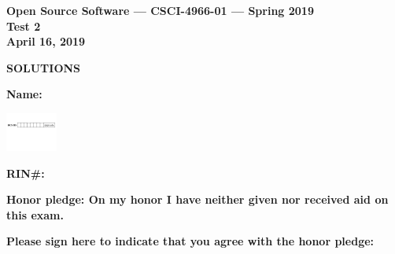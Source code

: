 \documentclass[10pt]{article}
\begin{document}
\thispagestyle{empty}

\vspace*{0.5in}

\begin{center}
\Large
\textbf{Open Source Software --- CSCI-4966-01 --- Spring 2019} \\
\textbf{Test 2} \\
\textbf{April 16, 2019}
\end{center}


\beginanswers
\begin{center}
\Large
\textbf{SOLUTIONS}
\end{center}

\else


\begin{center}

\textbf{\Large Name:} \underline {\hspace{2.0in}} \\

\bigskip
\bigskip

\centerline{
\includegraphics[height=0.5in]{boxes}
}


\bigskip

\textbf{\Large RIN\#:} \underline {\hspace{1.5in}}  

\vspace*{0.4in}
{\large\bf Honor pledge: On my honor I have neither given
nor received aid on this exam.}

\vspace*{0.1in}
{\large\bf Please sign here to indicate that you agree with the honor pledge: \underline {\hspace{1.5in}}}
\end{center}
\end{document}
